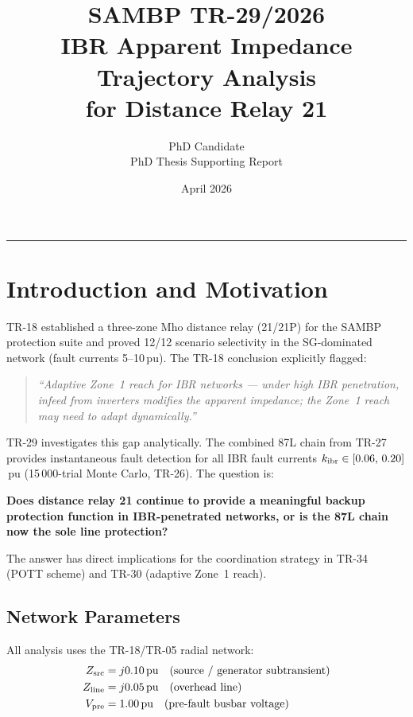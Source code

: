 \documentclass[11pt,a4paper]{article}
\title{%
  \textbf{SAMBP TR-29/2026}\\[4pt]
  IBR Apparent Impedance Trajectory Analysis\\
  for Distance Relay 21}
\author{PhD Candidate\\PhD Thesis Supporting Report}
\date{April 2026}
\begin{document}
\maketitle
\tableofcontents
\vspace{6pt}\hrule\vspace{10pt}

\section{Introduction and Motivation}

TR-18 established a three-zone Mho distance relay (21/21P) for the SAMBP
protection suite and proved 12/12 scenario selectivity in the
SG-dominated network (fault currents 5--10\,pu).  The TR-18 conclusion
explicitly flagged:

\begin{quote}
  \textit{``Adaptive Zone~1 reach for IBR networks --- under high IBR
  penetration, infeed from inverters modifies the apparent impedance;
  the Zone~1 reach may need to adapt dynamically.''}
\end{quote}

TR-29 investigates this gap analytically.  The combined 87L chain from
TR-27 provides instantaneous fault detection for all IBR fault currents
$k_{\rm ibr} \in [0.06,\,0.20]$\,pu (15\,000-trial Monte Carlo,
TR-26).  The question is:

\textbf{Does distance relay 21 continue to provide a meaningful backup
protection function in IBR-penetrated networks, or is the 87L chain
now the sole line protection?}

The answer has direct implications for the coordination strategy in
TR-34 (POTT scheme) and TR-30 (adaptive Zone~1 reach).

\subsection{Network Parameters}

All analysis uses the TR-18/TR-05 radial network:
\begin{align}
  Z_{\rm src}  &= j0.10\,\text{pu} \quad (\text{source / generator subtransient})\\
  Z_{\rm line} &= j0.05\,\text{pu} \quad (\text{overhead line})\\
  V_{\rm pre}  &= 1.00\,\text{pu}  \quad (\text{pre-fault busbar voltage})
\end{align}
\end{document}
